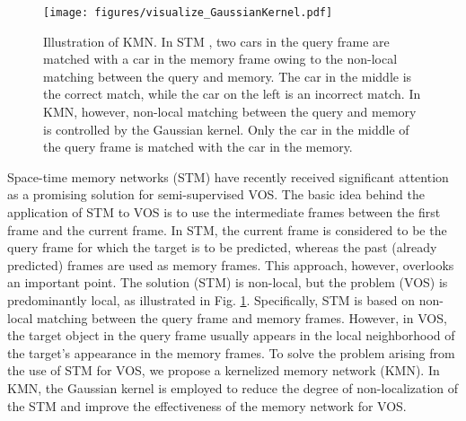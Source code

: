 \documentclass[runningheads]{llncs}
\begin{document}
\begin{figure}[t]
\centering
\texttt{[image: figures/visualize\_GaussianKernel.pdf]}
\caption{
Illustration of KMN. In STM \cite{Oh_2019_ICCV}, two cars in the query frame are matched with a car in the memory frame owing to the non-local matching between the query and memory. The car in the middle is the correct match, while the car on the left is an incorrect match. In KMN, however, non-local matching between the query and memory is controlled by the Gaussian kernel. Only the car in the middle of the query frame is matched with the car in the memory.
}
\label{fig:visualize_GaussianKernel}
\end{figure}

Space-time memory networks (STM) \cite{Oh_2019_ICCV} have recently received significant attention as a promising solution for semi-supervised VOS. The basic idea behind the application of STM to VOS is to use the intermediate frames between the first frame and the current frame. In STM, the current frame is considered to be the query frame for which the target is to be predicted, whereas the past (already predicted) frames are used as memory frames. This approach, however, overlooks an important point. The solution (STM) is non-local, but the problem (VOS) is predominantly local, as illustrated in Fig. \ref{fig:visualize_GaussianKernel}. Specifically, STM is based on non-local matching between the query frame and memory frames. However, in VOS, the target object in the query frame usually appears in the local neighborhood of the target’s appearance in the memory frames. To solve the problem arising from the use of STM for VOS, we propose a kernelized memory network (KMN). In KMN, the Gaussian kernel is employed to reduce the degree of non-localization of the STM and improve the effectiveness of the memory network for VOS.
\end{document}
